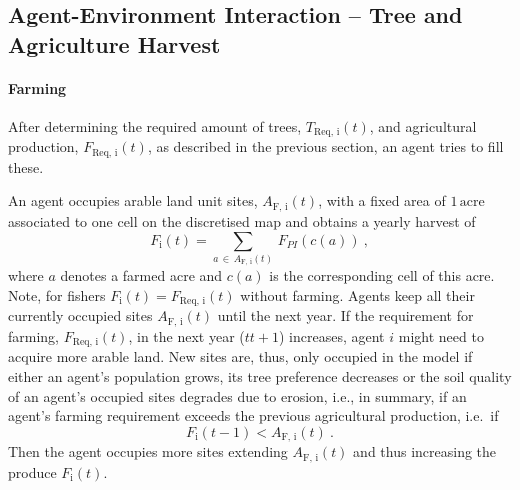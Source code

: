 \subsection{Agent-Environment Interaction -- Tree and Agriculture Harvest}\label{sec:Harvest}

\paragraph{Farming}
After determining the required amount of trees, $T_\text{Req, i}(t)$, and agricultural production, $F_\text{Req, i}(t)$, as described in the previous section, an agent tries to fill these.

An agent occupies arable land unit sites, $A_\text{F, i}(t)$, with a fixed area of $1\, \text{acre}$ associated to one cell on the discretised map and obtains a yearly harvest of
\begin{equation}\label{AProd}
F_\text{i}(t) = \sum_{a \, \in \, A_\text{F, i}(t)} \, F_{PI}(c(a))\ ,
\end{equation}
where $a$ denotes a farmed acre and $c(a)$ is the corresponding cell of this acre.
Note, for fishers $F_\text{i}(t) = F_\text{Req, i}(t)$ without farming.
Agents keep all their currently occupied sites $A_\text{F, i}(t)$ until the next year.%
If the requirement for farming,  $F_\text{Req, i}(t)$, in the next year ($t$\ra $t+1$) increases, agent $i$ might need to acquire more arable land.
New sites are, thus, only occupied in the model if either an agent's population grows, its tree preference decreases or the soil quality of an agent's occupied sites degrades due to erosion, i.e., in summary, if an agent's farming requirement exceeds the previous agricultural production, i.e.\ if 
\begin{equation}
	F_\text{i}(t-1) < A_\text{F, i}(t) \ .
\end{equation}
Then the agent occupies more sites extending $A_\text{F, i}(t)$ and thus increasing the produce $F_\text{i}(t)$.

